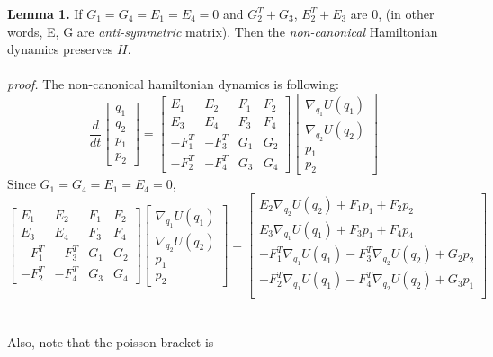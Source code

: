 \documentclass{article}
\begin{document}
\noindent \textbf{Lemma 1.}  If $G_1 = G_4 = E_1 = E_4  = 0$ and $G_2^T + G_3$, $E_2^T + E_3$ are 0, (in other words, E, G are \textit{anti-symmetric} matrix). Then the \textit{non-canonical} Hamiltonian dynamics preserves $H$.
\\
\\
\textit{proof.} The non-canonical hamiltonian dynamics is following: 
\[
\frac{d}{dt}
\left[
\begin{array}{ccc}
q_1 \\
q_2 \\
p_1 \\
p_2 
\end{array}
\right]
=
\left[
\begin{array}{cclcc}
E_{1} & E_{2} & F_{1} & F_{2} \\
E_3 & E_4 & F_3 & F_4 \\
-F_1^T & -F_3^T & G_1 & G_2 \\
-F_2^T & -F_4^T & G_3 & G_4 
\end{array}
\right]
\left[
\begin{array}{ccc}
\nabla_{q_1} U(q_1) \\
\nabla_{q_2} U(q_2) \\
p_1 \\
p_2 
\end{array}
\right]
\] 
Since $G_1 = G_4 = E_1 = E_4  = 0$,
\[
\left[
\begin{array}{cclcc}
E_{1} & E_{2} & F_{1} & F_{2} \\
E_3 & E_4 & F_3 & F_4 \\
-F_1^T & -F_3^T & G_1 & G_2 \\
-F_2^T & -F_4^T & G_3 & G_4 
\end{array}
\right]
\left[
\begin{array}{ccc}
\nabla_{q_1} U(q_1) \\
\nabla_{q_2} U(q_2) \\
p_1 \\
p_2 
\end{array}
\right] = 
\left[
\begin{array}{ccc}
E_2 \nabla_{q_2} U(q_2) + F_1 p_1 + F_2 p_2 \\
E_3 \nabla_{q_1} U(q_1) + F_3 p_1 + F_4 p_4 \\
-F_1^T \nabla_{q_1} U(q_1) - F_3^T \nabla_{q_2} U(q_2)  + G_2 p_2\\
-F_2^T \nabla_{q_1} U(q_1) - F_4^T \nabla_{q_2} U(q_2)  + G_3 p_1\\
\end{array}
\right]
\] 
\\
\\
Also, note that the poisson bracket is 
\end{document}
